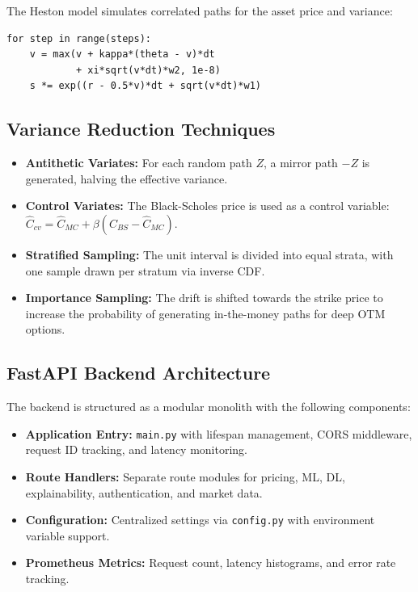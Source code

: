 \documentclass[12pt,a4paper]{report}
\begin{document}
The Heston model simulates correlated paths for the asset price and variance:

\begin{lstlisting}[style=pythonstyle, caption={Heston Monte Carlo Pseudocode}, label={lst:heston}]
for step in range(steps):
    v = max(v + kappa*(theta - v)*dt
            + xi*sqrt(v*dt)*w2, 1e-8)
    s *= exp((r - 0.5*v)*dt + sqrt(v*dt)*w1)
\end{lstlisting}

\subsection{Variance Reduction Techniques}

\begin{itemize}
    \item \textbf{Antithetic Variates:} For each random path $Z$, a mirror path $-Z$ is generated, halving the effective variance.
    \item \textbf{Control Variates:} The Black-Scholes price is used as a control variable: $\hat{C}_{cv} = \hat{C}_{MC} + \beta(C_{BS} - \hat{C}_{MC})$.
    \item \textbf{Stratified Sampling:} The unit interval is divided into equal strata, with one sample drawn per stratum via inverse CDF.
    \item \textbf{Importance Sampling:} The drift is shifted towards the strike price to increase the probability of generating in-the-money paths for deep OTM options.
\end{itemize}

\subsection{FastAPI Backend Architecture}

The backend is structured as a modular monolith with the following components:

\begin{itemize}
    \item \textbf{Application Entry:} \texttt{main.py} with lifespan management, CORS middleware, request ID tracking, and latency monitoring.
    \item \textbf{Route Handlers:} Separate route modules for pricing, ML, DL, explainability, authentication, and market data.
    \item \textbf{Configuration:} Centralized settings via \texttt{config.py} with environment variable support.
    \item \textbf{Prometheus Metrics:} Request count, latency histograms, and error rate tracking.
\end{itemize}
\end{document}
